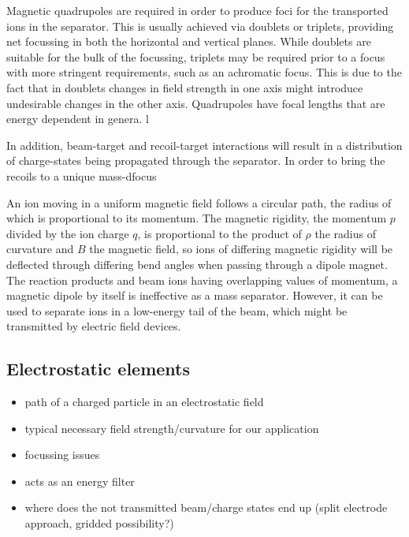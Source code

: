 Magnetic quadrupoles are required in order to produce foci for the transported ions in the separator. This is usually achieved via doublets or triplets, providing net focussing in both the horizontal and vertical planes. While doublets are suitable for the bulk of the focussing, triplets may be required prior to a focus with more stringent requirements, such as an achromatic focus. This is due to the fact that in doublets changes in field strength in one axis might introduce undesirable changes in the other axis. Quadrupoles have focal lengths that are energy dependent in genera. l  

In addition, beam-target and recoil-target interactions will result in a distribution of charge-states being propagated through the separator. In order to bring the recoils to a unique mass-dfocus   

An ion moving in a uniform magnetic field follows a circular path, the radius of which is proportional to its  momentum.  The magnetic rigidity, the momentum $p$ divided by the ion charge $q$, is proportional to the product of $\rho$ the radius of curvature and $B$ the magnetic field, so ions of differing magnetic rigidity will be deflected through differing bend angles  when passing through a dipole magnet.  The reaction products and beam ions having overlapping values of momentum, a magnetic dipole by itself is ineffective as a mass separator.  However, it can be used to separate ions in a low-energy tail of the beam, which might be transmitted by electric field devices.

\subsection{Electrostatic elements}

\small
\begin{itemize}
\item path of a charged particle in an electrostatic field
\item typical necessary field strength/curvature for our application
\item focussing issues
\item acts as an energy filter
\item where does the not transmitted beam/charge states end up (split electrode approach, gridded possibility?)
\end{itemize}
\normalsize

